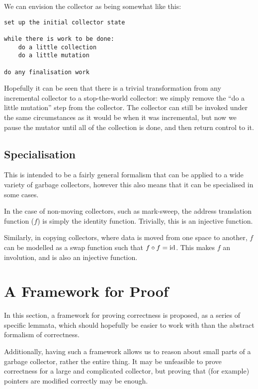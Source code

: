 We can envision the collector as being somewhat like this:

\begin{verbatim}
set up the initial collector state

while there is work to be done:
    do a little collection
    do a little mutation

do any finalisation work
\end{verbatim}

Hopefully it can be seen that there is a trivial transformation from
any \gls{incremental collector} to a stop-the-world \gls{collector}:
we simply remove the ``do a little mutation'' step from the
collector. The collector can still be invoked under the same
circumstances as it would be when it was incremental, but now we pause
the \gls{mutator} until all of the collection is done, and then return
control to it.

\subsection{Specialisation}

This is intended to be a fairly general formalism that can be applied
to a wide variety of garbage collectors, however this also means that
it can be specialised in some cases.

In the case of non-moving collectors, such as mark-sweep, the address
translation function ($f$) is simply the identity function. Trivially,
this is an injective function.

Similarly, in copying collectors, where data is moved from one space
to another, $f$ can be modelled as a swap function such that $f \circ f
= \mathrm{id}$. This makes $f$ an involution, and is also an injective
function.

\section{A Framework for Proof}

In this section, a framework for proving correctness is proposed, as a
series of specific lemmata, which should hopefully be easier to work
with than the abstract formalism of correctness.

Additionally, having such a framework allows us to reason about small
parts of a \gls{garbage collector}, rather the entire thing. It may be
unfeasible to prove correctness for a large and complicated
\gls{collector}, but proving that (for example) \glspl{pointer} are
modified correctly may be enough.

